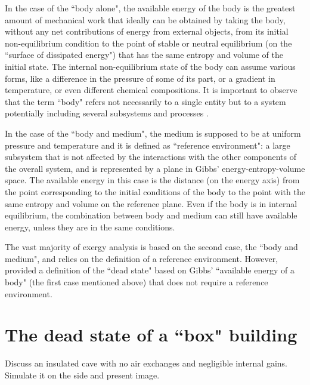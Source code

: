 \documentclass[10pt]{extarticle} %
\begin{document}
In the case of the ``body alone", the available energy of the body is the greatest amount of mechanical work that ideally can be obtained by taking the body, without any net contributions of energy from external objects, from its initial non-equilibrium condition to the point of stable or neutral equilibrium (on the ``surface of dissipated energy") that has the same entropy and volume of the initial state. The internal non-equilibrium state of the body can assume various forms, like a difference in the pressure of some of its part, or a gradient in temperature, or even different chemical compositions. It is important to observe that the term ``body" refers not necessarily to a single entity but to a system potentially including several subsystems and processes \citep{Gaggioli2012}.
 
In the case of the ``body and medium", the medium is supposed to be at uniform pressure and temperature and it is defined as ``reference environment": a large subsystem that is not affected by the interactions with the other components of the overall system, and is represented by a plane in Gibbs' energy-entropy-volume space. The available energy in this case is the distance (on the energy axis) from the point corresponding to the initial conditions of the body to the point with the same entropy and volume on the reference plane. Even if the body is in internal equilibrium, the combination between body and medium can still have available energy, unless they are in the same conditions. 


The vast majority of exergy analysis is based on the second case, the  ``body and medium", and relies on the definition of a reference environment. However, \cite{Gaggioli2012} provided a definition of the ``dead state" based on Gibbs' ``available energy of a body" (the first case mentioned above)  that does not require a reference environment. 


\section{The dead state of a ``box" building} \label{subsec:simple}

Discuss an insulated cave with no air exchanges and negligible internal gains. Simulate it on the side and present image.
\end{document}
